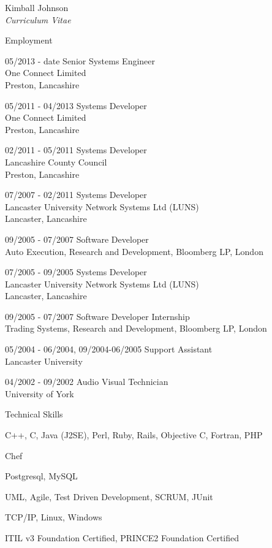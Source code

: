 \documentclass[10pt]{article}
\begin{document}
\begin{cv}{Kimball Johnson\\{\large \itshape Curriculum Vitae}}
\begin{cvlist}{Employment}
    \item[05/2013 - date] Senior Systems Engineer\\
    One Connect Limited\\
    Preston, Lancashire
    \item[05/2011 - 04/2013] Systems Developer\\
    One Connect Limited\\
    Preston, Lancashire
    \item[02/2011 - 05/2011] Systems Developer\\
    Lancashire County Council\\
    Preston, Lancashire
	\item[07/2007 - 02/2011] Systems Developer\\
	Lancaster University Network Systems Ltd (LUNS)\\
	Lancaster, Lancashire
    \item[09/2005 - 07/2007] Software Developer \\
    Auto Execution, Research and Development, Bloomberg LP,
    London
    \item[07/2005 - 09/2005] Systems Developer \\ 
	Lancaster University Network Systems Ltd (LUNS)\\
	Lancaster, Lancashire
    \item[09/2005 - 07/2007] Software Developer Internship\\
    Trading Systems, Research and Development, Bloomberg LP,
    London
    \item[05/2004 - 06/2004, 09/2004-06/2005] Support Assistant\\
    Lancaster University
    \item[04/2002 - 09/2002] Audio Visual Technician\\
    University of York
\end{cvlist}
\setlength{\oldcvlabelwidth}{\cvlabelwidth}
\setlength{\cvlabelwidth}{1em}
\begin{cvlist}{Technical Skills}
		\item C++, C, Java (J2SE), Perl, Ruby, Rails, Objective C, Fortran, PHP
		\item Chef
		\item Postgresql, MySQL
		\item UML, Agile, Test Driven Development, SCRUM, JUnit
		\item TCP/IP, Linux, Windows
		\item ITIL v3 Foundation Certified, PRINCE2 Foundation Certified
\end{cvlist}
\setlength{\cvlabelwidth}{\oldcvlabelwidth}
\pagebreak


\end{cv}
\end{document}
